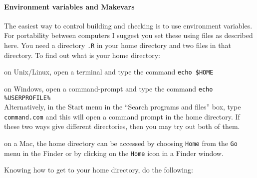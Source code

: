 \documentclass[12pt, a4paper]{article}
\renewcommand{\=}{\,=\,}
\newcommand{\+}{\,+\,}
\begin{document}
\paragraph{Environment variables and Makevars}
 \label{below}
 The easiest way to control building and checking is to use environment
 variables. For portability between computers I suggest you set these using
 files as described here. You need a directory \verb|.R| in your home directory
 and two files in that directory.
 To find out what is your home directory:
\begin{description}
\item on Unix/Linux, open a terminal and type the command \verb|echo $HOME|
\item on Windows, open a command-prompt and type the command
    \verb|echo %USERPROFILE%| \\
    Alternatively, in the Start menu in the ``Search programs and files'' box,
    type \verb|command.com| and this will open a command prompt in
    the home directory.
    If these two ways give different directories,
    then you may try out both of them.
\item on a Mac, the home directory can be accessed by
    choosing \verb|Home| from the \verb|Go| menu in the Finder
    or by clicking on the \verb|Home| icon in a Finder window.
\end{description}
 Knowing how to get to your home directory, do the following:
\end{document}
